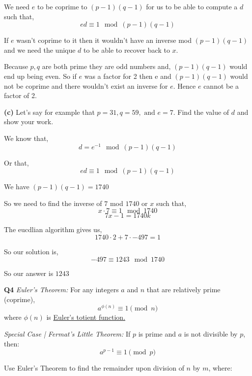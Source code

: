 \documentclass[12pt]{article}
\newcommand{\question}[3][Q]{
\begin{description}
\item \textbf{#1{#2}} #3
\end{description}
}
\begin{document}
\begin{answer}
    We need $e$ to be coprime to $(p-1)(q-1)$ for us to be able to compute a $d$ such that, 
    $$ ed \equiv 1 \mod (p-1)(q-1) $$ 

    If $e$ wasn't coprime to it then it wouldn't have an inverse mod  $(p-1)(q-1)$ and we need the unique $d$ to be able to recover back to $x$.

    Because $p,q$ are both prime they are odd numbers and, $ (p-1)(q-1) $ would end up being even. So if $e$ was a factor for 2 then e and $(p-1)(q-1)$ would not be coprime and there wouldn't exist an inverse for $e$. Hence $e$ cannot be a factor of 2.
\end{answer}


\question[]{(c)} {
Let's say for example that $p = 31,  q = 59, \text{ and } e = 7.$ Find the value of $d$ and show your work.

}
\begin{answer}

    We know that, 
    $$ d = e^{-1} \mod (p-1)(q-1) $$ 

    Or that, 
    $$ ed \equiv 1 \mod (p-1)(q - 1)  $$ 


    We have $(p-1)(q - 1) = 1740$


    So we need to find the inverse of  $7$ mod $1740$ or  $x $ such that, 
    $$ x \cdot 7 \equiv 1 \mod 1740 $$ 
    $$ 7x - 1 = 1740k $$ 

    The eucdlian algorithm gives us, 
    $$ 1740 \cdot 2  + 7 \cdot -497 = 1 $$ 

    So our solution is, 
    $$ -497 \equiv 1243 \mod 1740$$  

    So our answer is $1243$
\end{answer}


\newpage 

\question{4}{
    \textit{Euler's Theorem:} For any integers $a$ and $n$ that are relatively prime (coprime), 
    $$ a^{\phi(n)} \equiv 1 \pmod{n} $$
    where $\phi(n)$ is \href{https://en.wikipedia.org/wiki/Euler\%27s_totient_function}{Euler's totient function.}
    
    \textit{Special Case | Fermat's Little Theorem:}
    If $p$ is prime and $a$ is not divisible by $p$, then:
    $$ a^{p-1} \equiv 1 \pmod{p} $$
    
    Use Euler's Theorem to find the remainder upon division of $n$ by $m$, where:
}
\end{document}
